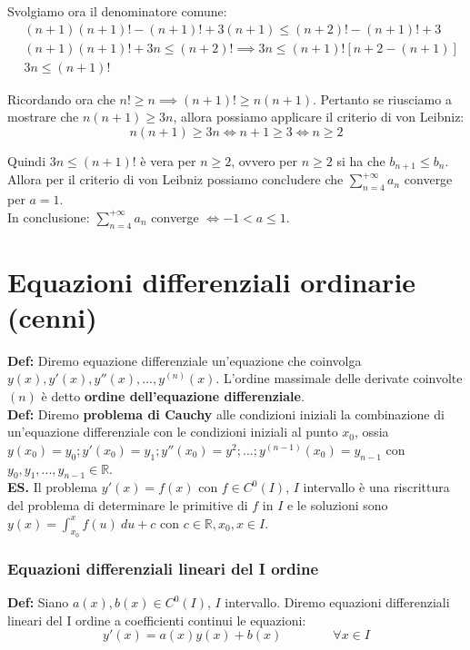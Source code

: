 \documentclass{article}
\begin{document}
\noindent Svolgiamo ora il denominatore comune:
\begin{align*}
    & (n + 1)(n + 1)! - (n + 1)! + 3(n + 1) \leq (n + 2)! - (n + 1)! + 3 \\
    & (n + 1)(n + 1)! + 3n \leq (n + 2)! \implies 3n \leq (n + 1)![n + 2 - (n + 1)]\\
    & 3n \leq (n + 1)!
\end{align*}

\noindent Ricordando ora che $n! \geq n \implies (n + 1)! \geq n(n + 1)$. Pertanto se riusciamo a mostrare che $n(n + 1) \geq 3n$, allora possiamo applicare il criterio di von Leibniz:
\begin{equation*}
    n(n + 1) \geq 3n \iff n + 1 \geq 3 \iff n \geq 2
\end{equation*}

\noindent Quindi $3n \leq (n + 1)!$ è vera per $n \geq 2$, ovvero per $n \geq 2$ si ha che $b_{n + 1} \leq b_n$. Allora per il criterio di von Leibniz possiamo concludere che $\sum_{n = 4}^{+\infty} a_n$ converge per $a = 1$.\\
In conclusione: $\sum_{n = 4}^{+\infty} a_n$ converge $\iff -1 < a \leq 1$.

\newpage
\part{Equazioni differenziali ordinarie (cenni)}
\textbf{Def:} Diremo equazione differenziale un'equazione che coinvolga $y(x), y'(x), y''(x), ..., y^{(n)}(x)$. L'ordine massimale delle derivate coinvolte $(n)$ è detto \textbf{ordine dell'equazione differenziale}.\\

\noindent\textbf{Def:} Diremo \textbf{problema di Cauchy} alle condizioni iniziali la combinazione di un'equazione differenziale con le condizioni iniziali al punto $x_0$, ossia $y(x_0) = y_0; y'(x_0) = y_1; y''(x_0) = y^2; ...; y^{(n - 1)}(x_0) = y_{n - 1}$ con $y_0, y_1, ..., y_{n - 1} \in \mathbb{R}$.\\

\noindent\textbf{ES.} Il problema $y'(x) = f(x)$ con $f \in C^0(I)$, $I$ intervallo è una riscrittura del problema di determinare le primitive di $f$ in $I$ e le soluzioni sono $y(x) = \int_{x_0}^x f(u) \ du + c$ con $c \in \mathbb{R}, x_0, x \in I$.

\section{Equazioni differenziali lineari del I ordine}
\textbf{Def:} Siano $a(x), b(x) \in C^0(I)$, $I$ intervallo. Diremo equazioni differenziali lineari del I ordine a coefficienti continui le equazioni: 
\begin{equation}
    y'(x) = a(x)y(x) + b(x) \qquad \qquad \forall x \in I
    \label{eq:19}
\end{equation}
\end{document}
